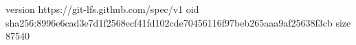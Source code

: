 version https://git-lfs.github.com/spec/v1
oid sha256:8996e6cad3e7d1f2568ecf41fd102cde70456116f97beb265aaa9af25638f3cb
size 87540
